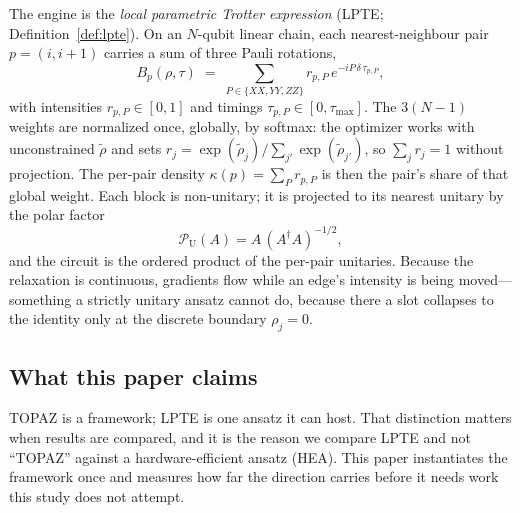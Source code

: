 \documentclass[twocolumn,aps,prl,superscriptaddress,showkeys]{revtex4-2}
\theoremstyle{plain}
\theoremstyle{definition}
\begin{document}
The engine is the \emph{local parametric Trotter expression} (LPTE; Definition~\ref{def:lpte}). On an $N$-qubit linear chain, each nearest-neighbour pair $p=(i,i{+}1)$ carries a sum of three Pauli rotations,
\begin{equation}
B_p(\rho,\tau) \;=\; \sum_{P\in\{XX,YY,ZZ\}} r_{p,P}\, e^{-iP\,\delta\,\tau_{p,P}},
\label{eq:lpte-pair}
\end{equation}
with intensities $r_{p,P}\in[0,1]$ and timings $\tau_{p,P}\in[0,\tau_{\max}]$. The $3(N-1)$ weights are normalized once, globally, by softmax: the optimizer works with unconstrained $\tilde\rho$ and sets $r_j=\exp(\tilde\rho_j)/\sum_{j'}\exp(\tilde\rho_{j'})$, so $\sum_j r_j=1$ without projection. The per-pair density $\kappa(p)=\sum_P r_{p,P}$ is then the pair's share of that global weight. Each block is non-unitary; it is projected to its nearest unitary by the polar factor
\begin{equation}
\mathcal{P}_{\mathrm{U}}(A) = A\,(A^\dagger A)^{-1/2},
\label{eq:polar}
\end{equation}
and the circuit is the ordered product of the per-pair unitaries. Because the relaxation is continuous, gradients flow while an edge's intensity is being moved---something a strictly unitary ansatz cannot do, because there a slot collapses to the identity only at the discrete boundary $\rho_j=0$.

\subsection{What this paper claims}

TOPAZ is a framework; LPTE is one ansatz it can host. That distinction matters when results are compared, and it is the reason we compare LPTE and not ``TOPAZ'' against a hardware-efficient ansatz (HEA). This paper instantiates the framework once and measures how far the direction carries before it needs work this study does not attempt.
\end{document}
